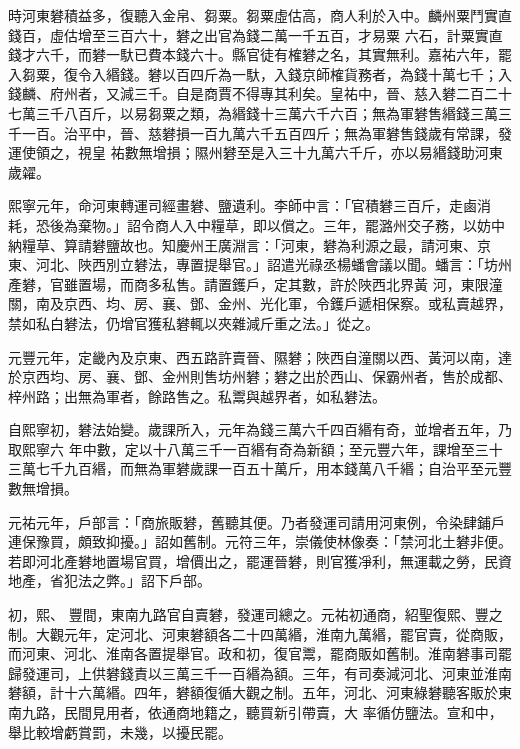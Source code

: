 \begin{pinyinscope}
 時河東礬積益多，復聽入金帛、芻粟。芻粟虛估高，商人利於入中。麟州粟鬥實直錢百，虛估增至三百六十，礬之出官為錢二萬一千五百，才易粟
 六石，計粟實直錢才六千，而礬一馱已費本錢六十。縣官徒有榷礬之名，其實無利。嘉祐六年，罷入芻粟，復令入緡錢。礬以百四斤為一馱，入錢京師榷貨務者，為錢十萬七千；入錢麟、府州者，又減三千。自是商賈不得專其利矣。皇祐中，晉、慈入礬二百二十七萬三千八百斤，以易芻粟之類，為緡錢十三萬六千六百；無為軍礬售緡錢三萬三千一百。治平中，晉、慈礬損一百九萬六千五百四斤；無為軍礬售錢歲有常課，發運使領之，視皇
 祐數無增損；隰州礬至是入三十九萬六千斤，亦以易緡錢助河東歲糴。



 熙寧元年，命河東轉運司經畫礬、鹽遺利。李師中言：「官積礬三百斤，走鹵消耗，恐後為棄物。」詔令商人入中糧草，即以償之。三年，罷潞州交子務，以妨中納糧草、算請礬鹽故也。知慶州王廣淵言：「河東，礬為利源之最，請河東、京東、河北、陜西別立礬法，專置提舉官。」詔遣光祿丞楊蟠會議以聞。蟠言：「坊州產礬，官雖置場，而商多私售。請置鑊戶，定其數，許於陜西北界黃
 河，東限潼關，南及京西、均、房、襄、鄧、金州、光化軍，令鑊戶遞相保察。或私賣越界，禁如私白礬法，仍增官獲私礬輒以夾雜減斤重之法。」從之。



 元豐元年，定畿內及京東、西五路許賣晉、隰礬；陜西自潼關以西、黃河以南，達於京西均、房、襄、鄧、金州則售坊州礬；礬之出於西山、保霸州者，售於成都、梓州路；出無為軍者，餘路售之。私鬻與越界者，如私礬法。



 自熙寧初，礬法始變。歲課所入，元年為錢三萬六千四百緡有奇，並增者五年，乃取熙寧六
 年中數，定以十八萬三千一百緡有奇為新額；至元豐六年，課增至三十三萬七千九百緡，而無為軍礬歲課一百五十萬斤，用本錢萬八千緡；自治平至元豐數無增損。



 元祐元年，戶部言：「商旅販礬，舊聽其便。乃者發運司請用河東例，令染肆鋪戶連保豫買，頗致抑擾。」詔如舊制。元符三年，崇儀使林像奏：「禁河北土礬非便。若即河北產礬地置場官買，增價出之，罷運晉礬，則官獲凈利，無運載之勞，民資地產，省犯法之弊。」詔下戶部。



 初，熙、
 豐間，東南九路官自賣礬，發運司總之。元祐初通商，紹聖復熙、豐之制。大觀元年，定河北、河東礬額各二十四萬緡，淮南九萬緡，罷官賣，從商販，而河東、河北、淮南各置提舉官。政和初，復官鬻，罷商販如舊制。淮南礬事司罷歸發運司，上供礬錢責以三萬三千一百緡為額。三年，有司奏減河北、河東並淮南礬額，計十六萬緡。四年，礬額復循大觀之制。五年，河北、河東綠礬聽客販於東南九路，民間見用者，依通商地籍之，聽買新引帶賣，大
 率循仿鹽法。宣和中，舉比較增虧賞罰，未幾，以擾民罷。




\end{pinyinscope}
